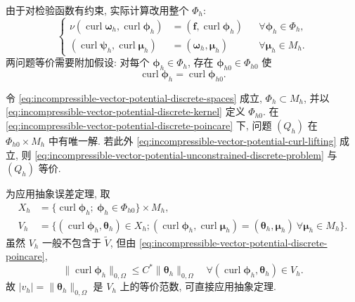由于对检验函数有约束, 实际计算改用整个 $\Phi_h$:
\begin{equation}\label{eq:incompressible-vector-potential-unconstrained-discrete-problem}
\left\{
\begin{aligned}
\nu(\operatorname{curl}\boldsymbol\omega_h,
\operatorname{curl}\boldsymbol\phi_h)
&=(\mathbf f,\operatorname{curl}\boldsymbol\phi_h)
&&\forall\boldsymbol\phi_h\in\Phi_h,\\
(\operatorname{curl}\boldsymbol\psi_h,
\operatorname{curl}\boldsymbol\mu_h)
&=(\boldsymbol\omega_h,\boldsymbol\mu_h)
&&\forall\boldsymbol\mu_h\in M_h.
\end{aligned}
\right.
\end{equation}
两问题等价需要附加假设: 对每个 $\boldsymbol\phi_h\in\Phi_h$,
存在 $\boldsymbol\phi_{h0}\in\Phi_{h0}$ 使
\begin{equation}\label{eq:incompressible-vector-potential-curl-lifting}
\operatorname{curl}\boldsymbol\phi_h
=\operatorname{curl}\boldsymbol\phi_{h0}.
\end{equation}

\begin{Lemma}\label{lem:incompressible-vector-potential-discrete-solvability}
令 \eqref{eq:incompressible-vector-potential-discrete-spaces} 成立,
$\Phi_h\subset M_h$, 并以
\eqref{eq:incompressible-vector-potential-discrete-kernel}
定义 $\Phi_{h0}$. 在
\eqref{eq:incompressible-vector-potential-discrete-poincare} 下,
问题 $(Q_h)$ 在 $\Phi_{h0}\times M_h$ 中有唯一解.
若此外 \eqref{eq:incompressible-vector-potential-curl-lifting} 成立,
则 \eqref{eq:incompressible-vector-potential-unconstrained-discrete-problem}
与 $(Q_h)$ 等价.
\end{Lemma}

为应用抽象误差定理, 取
\begin{align}
X_h&=\{\operatorname{curl}\boldsymbol\phi_h;
\ \boldsymbol\phi_h\in\Phi_{h0}\}\times M_h,
\label{eq:incompressible-vector-potential-discrete-product-space}\\
V_h&=\{(\operatorname{curl}\boldsymbol\phi_h,\boldsymbol\theta_h)
\in X_h;
(\operatorname{curl}\boldsymbol\phi_h,
\operatorname{curl}\boldsymbol\mu_h)
=(\boldsymbol\theta_h,\boldsymbol\mu_h)
\ \forall\boldsymbol\mu_h\in M_h\}.
\label{eq:incompressible-vector-potential-discrete-nullspace}
\end{align}
虽然 $V_h$ 一般不包含于 $\widetilde V$, 但由
\eqref{eq:incompressible-vector-potential-discrete-poincare},
\begin{equation}\label{eq:incompressible-vector-potential-discrete-kernel-control}
\|\operatorname{curl}\boldsymbol\phi_h\|_{0,\Omega}
\leq C^*\|\boldsymbol\theta_h\|_{0,\Omega}
\quad\forall(\operatorname{curl}\boldsymbol\phi_h,
\boldsymbol\theta_h)\in V_h.
\end{equation}
故 $|v_h|=\|\boldsymbol\theta_h\|_{0,\Omega}$
是 $V_h$ 上的等价范数, 可直接应用抽象定理.

